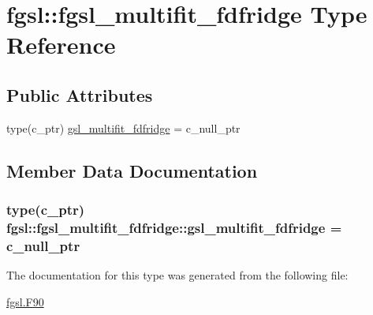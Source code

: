 \hypertarget{structfgsl_1_1fgsl__multifit__fdfridge}{}\section{fgsl\+:\+:fgsl\+\_\+multifit\+\_\+fdfridge Type Reference}
\label{structfgsl_1_1fgsl__multifit__fdfridge}
\subsection*{Public Attributes}
\begin{DoxyCompactItemize}
\item 
type(c\+\_\+ptr) \hyperlink{structfgsl_1_1fgsl__multifit__fdfridge_a53d3d5b20e366ed979b1c7e65d91a9c2}{gsl\+\_\+multifit\+\_\+fdfridge} = c\+\_\+null\+\_\+ptr
\end{DoxyCompactItemize}


\subsection{Member Data Documentation}
\hypertarget{structfgsl_1_1fgsl__multifit__fdfridge_a53d3d5b20e366ed979b1c7e65d91a9c2}{}
\subsubsection[{gsl\+\_\+multifit\+\_\+fdfridge}]{\setlength{\rightskip}{0pt plus 5cm}type(c\+\_\+ptr) fgsl\+::fgsl\+\_\+multifit\+\_\+fdfridge\+::gsl\+\_\+multifit\+\_\+fdfridge = c\+\_\+null\+\_\+ptr}\label{structfgsl_1_1fgsl__multifit__fdfridge_a53d3d5b20e366ed979b1c7e65d91a9c2}


The documentation for this type was generated from the following file\+:\begin{DoxyCompactItemize}
\item 
\hyperlink{fgsl_8F90}{fgsl.\+F90}\end{DoxyCompactItemize}
